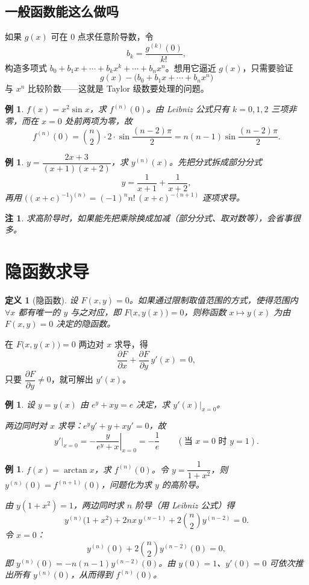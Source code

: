 \documentclass[UTF8,11pt]{ctexart}
\theoremstyle{cnthm}
\newtheorem{defn}[thm]{定义}
\newtheorem{rem}[thm]{注}
\newtheorem{exa}[thm]{例}
\begin{document}
\subsection{一般函数能这么做吗}

如果 $g(x)$ 可在 $0$ 点求任意阶导数，令
\[
b_k=\frac{g^{(k)}(0)}{k!},
\]
构造多项式 $b_0+b_1x+\cdots+b_kx^{k}+\cdots+b_nx^{n}$。想用它逼近 $g(x)$，只需要验证
\[
g(x)-\bigl(b_0+b_1x+\cdots+b_nx^{n}\bigr)
\]
与 $x^{n}$ 比较阶数——这就是 Taylor 级数要处理的问题。

\begin{exa}
$f(x)=x^{2}\sin x$，求 $f^{(n)}(0)$。由 Leibniz 公式只有 $k=0,1,2$ 三项非零，而在 $x=0$ 处前两项为零，故
\[
f^{(n)}(0)=\binom{n}{2}\cdot 2\cdot\sin\frac{(n-2)\pi}{2}
=n(n-1)\sin\frac{(n-2)\pi}{2}.
\]
\end{exa}

\begin{exa}
$y=\dfrac{2x+3}{(x+1)(x+2)}$，求 $y^{(n)}(x)$。先把分式拆成部分分式
\[
y=\frac{1}{x+1}+\frac{1}{x+2},
\]
再用 $\bigl((x+c)^{-1}\bigr)^{(n)}=(-1)^{n}n!\,(x+c)^{-(n+1)}$ 逐项求导。
\end{exa}

\begin{rem}
求高阶导时，如果能先把乘除换成加减（部分分式、取对数等），会省事很多。
\end{rem}

\section{隐函数求导}

\begin{defn}[隐函数]
设 $F(x,y)=0$。如果通过限制取值范围的方式，使得范围内 $\forall x$ 都有唯一的 $y$ 与之对应，即 $F\bigl(x,y(x)\bigr)=0$，则称函数 $x\mapsto y(x)$ 为由 $F(x,y)=0$ 决定的隐函数。
\end{defn}

在 $F\bigl(x,y(x)\bigr)=0$ 两边对 $x$ 求导，得
\[
\frac{\partial F}{\partial x}+\frac{\partial F}{\partial y}\,y'(x)=0,
\]
只要 $\dfrac{\partial F}{\partial y}\neq0$，就可解出 $y'(x)$。

\begin{exa}
设 $y=y(x)$ 由 $e^{y}+xy=e$ 决定，求 $y'(x)|_{x=0}$。

两边同时对 $x$ 求导：$e^{y}y'+y+xy'=0$，故
\[
y'\Big|_{x=0}=-\left.\frac{y}{e^{y}+x}\right|_{x=0}=-\frac{1}{e}
\qquad(\text{当 }x=0\text{ 时 }y=1).
\]
\end{exa}

\begin{exa}
$f(x)=\arctan x$，求 $f^{(n)}(0)$。令 $y=\dfrac{1}{1+x^{2}}$，则 $y^{(n)}(0)=f^{(n+1)}(0)$，问题化为求 $y$ 的高阶导。

由 $y(1+x^{2})=1$，两边同时求 $n$ 阶导（用 Leibniz 公式）得
\[
y^{(n)}\bigl(1+x^{2}\bigr)+2nx\,y^{(n-1)}+2\binom{n}{2}y^{(n-2)}=0 .
\]
令 $x=0$：
\[
y^{(n)}(0)+2\binom{n}{2}y^{(n-2)}(0)=0,
\]
即 $y^{(n)}(0)=-n(n-1)y^{(n-2)}(0)$。由 $y(0)=1$、$y'(0)=0$ 可依次推出所有 $y^{(n)}(0)$，从而得到 $f^{(n)}(0)$。
\end{exa}
\end{document}
